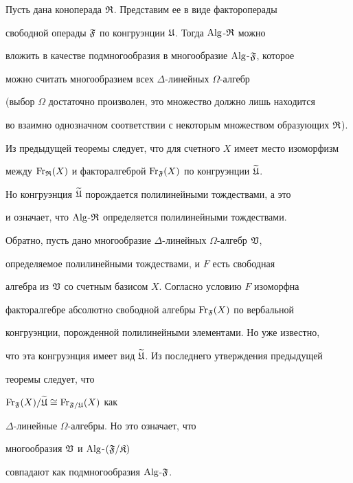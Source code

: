 \begin{pf}


Пусть дана коноперада $\frak R$. Представим ее в виде фактороперады


свободной операды $\frak F$ по конгруэнции $\frak U$. Тогда $\operatorname{Alg}$-$\frak R$ можно


вложить в качестве подмногообразия в многообразие $\operatorname{Alg}$-$\frak F$, которое


можно считать многообразием всех $\Delta$-линейных $\Omega$-алгебр


(выбор $\Omega$ достаточно произволен, это множество должно лишь находится


во взаимно однозначном соответствии с некоторым множеством образующих $\frak R$).


Из предыдущей теоремы следует, что для счетного $X$ имеет место изоморфизм


между $\operatorname{Fr}_{\frak R}(X)$ и факторалгеброй $\operatorname{Fr}_{\frak F}(X)$ по конгруэнции $\widetilde{\frak U}$.


Но конгруэнция $\widetilde{\frak U}$ порождается полилинейными тождествами, а это 


и означает, что $\operatorname{Alg}$-$\frak R$ определяется полилинейными тождествами.





Обратно, пусть дано многообразие $\Delta$-линейных $\Omega$-алгебр $\frak V$,


определяемое полилинейными тождествами, и $F$ есть свободная


алгебра из $\frak V$ со счетным базисом $X$. Согласно условию $F$ изоморфна


факторалгебре абсолютно свободной алгебры $\operatorname{Fr}_{\frak F}(X)$ по вербальной


конгруэнции, порожденной полилинейными элементами. Но уже известно,


что эта конгруэнция имеет вид $\widetilde{\frak U}$. Из последнего утверждения предыдущей


теоремы следует, что


$\operatorname{Fr}_{\frak F}(X)/\widetilde{\frak U}\cong \operatorname{Fr}_{\frak F/\frak U}(X)$ как


$\Delta$-линейные $\Omega$-алгебры. Но это означает, что


многообразия $\frak V$ и $\operatorname{Alg}$-$(\frak F/\frak K)$


совпадают как подмногообразия $\operatorname{Alg}$-$\frak F$.


\end{pf}








